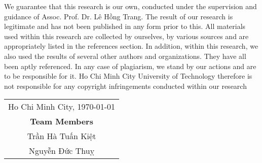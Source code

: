 
\begin{declaration}

    We guarantee that this research is our own, conducted under the supervision and guidance of
    Assoc. Prof. Dr. Lê Hồng Trang. The result of our research is legitimate and has not been published in any
    form prior to this. All materials used within this research are collected by ourselves, by
    various sources and are appropriately listed in the references section. In addition, within this
    research, we also used the results of several other authors and organizations. They have all been
    aptly referenced. In any case of plagiarism, we stand by our actions and are to be responsible for
    it. Ho Chi Minh City University of Technology therefore is not responsible for any copyright
    infringements conducted within our research

    \begin{flushright}

        \begin{tabular}{@{}c@{}}
            Ho Chi Minh City, \today \\
            \textbf{Team Members}    \\
            Trần Hà Tuấn Kiệt        \\
            Nguyễn Đức Thuỵ
        \end{tabular}

    \end{flushright}
\end{declaration}

\newpage


